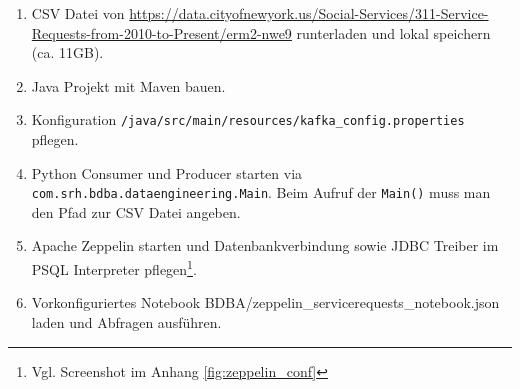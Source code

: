 \begin{enumerate}
	\item CSV Datei von \hyperref[https://data.cityofnewyork.us/Social-Services/311-Service-Requests-from-2010-to-Present/erm2-nwe9]{https://data.cityofnewyork.us/Social-Services/311-Service-Requests-from-2010-to-Present/erm2-nwe9} runterladen und lokal speichern (ca. 11GB).
	\item Java Projekt mit Maven  bauen.
	\item Konfiguration \texttt{/java/src/main/resources/kafka\_config.properties} pflegen.
	\item Python Consumer und Producer starten via \texttt{com.srh.bdba.dataengineering.Main}. Beim Aufruf der \texttt{Main()} muss man den Pfad zur CSV Datei angeben.
	\item Apache Zeppelin starten und Datenbankverbindung sowie JDBC Treiber im PSQL Interpreter pflegen\footnote{Vgl. Screenshot im Anhang \ref{fig:zeppelin_conf}}.
	\item Vorkonfiguriertes Notebook BDBA/zeppelin\_servicerequests\_notebook.json laden und Abfragen ausführen.
\end{enumerate}
